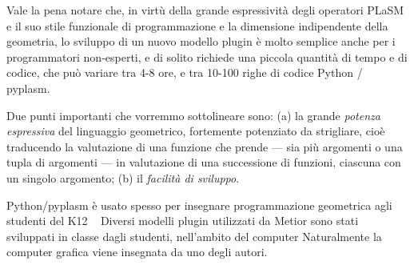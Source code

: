 
Vale la pena notare che, in virt\`u della grande espressivit\`a degli operatori PLaSM e il suo stile funzionale di programmazione
e la dimensione indipendente della geometria, lo sviluppo di un nuovo modello plugin è molto semplice anche per i programmatori
non-esperti, e di solito richiede una piccola quantit\`a di tempo e di codice, che pu\`o variare tra 4-8 ore,
e tra 10-100 righe di codice Python / pyplasm.




Due punti importanti che vorremmo sottolineare sono: (a) la grande \emph{potenza espressiva} del linguaggio geometrico,
fortemente potenziato da strigliare, cioè ~ traducendo la valutazione di una funzione che prende --- sia più argomenti
o una tupla di argomenti --- in valutazione di una successione di funzioni, ciascuna con un singolo argomento;
(b) il \emph{facilità di sviluppo}.


   Python/pyplasm \`e usato spesso per insegnare programmazione geometrica agli studenti del K12 ~\cite{ncLab}
   Diversi modelli plugin utilizzati da Metior sono stati sviluppati in classe dagli studenti, nell'ambito del computer
   Naturalmente la computer grafica viene insegnata da uno degli autori.

